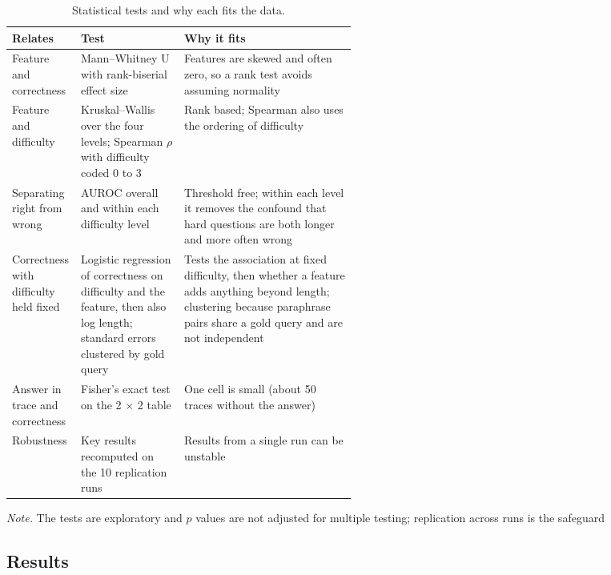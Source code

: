 \begin{table}[htbp]
\centering
\caption{Statistical tests and why each fits the data.}
\label{tab:tests}
\scriptsize
\begin{tabularx}{\linewidth}{@{}>{\raggedright\arraybackslash}p{0.2\linewidth}>{\raggedright\arraybackslash}p{0.3\linewidth}>{\raggedright\arraybackslash}X@{}}
\toprule
Relates & Test & Why it fits \\
\midrule
Feature and correctness & Mann--Whitney U with rank-biserial effect size & Features are skewed and often zero, so a rank test avoids assuming normality \\
Feature and difficulty & Kruskal--Wallis over the four levels; Spearman $\rho$ with difficulty coded 0 to 3 & Rank based; Spearman also uses the ordering of difficulty \\
Separating right from wrong & AUROC overall and within each difficulty level & Threshold free; within each level it removes the confound that hard questions are both longer and more often wrong \\
Correctness with difficulty held fixed & Logistic regression of correctness on difficulty and the feature, then also log length; standard errors clustered by gold query & Tests the association at fixed difficulty, then whether a feature adds anything beyond length; clustering because paraphrase pairs share a gold query and are not independent \citep{miller2024errorbars} \\
Answer in trace and correctness & Fisher's exact test on the 2 $\times$ 2 table & One cell is small (about 50 traces without the answer) \\
Robustness & Key results recomputed on the 10 replication runs & Results from a single run can be unstable \citep{tian2026week3} \\
\bottomrule
\end{tabularx}

\vspace{2pt}
\begin{minipage}{\linewidth}\scriptsize
\textit{Note.} The tests are exploratory and $p$ values are not adjusted for multiple testing; replication across runs is the safeguard
\end{minipage}
\end{table}

\subsection*{Results}

